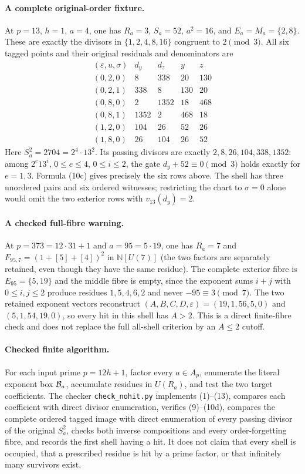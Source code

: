 \paragraph{A complete original-order fixture.}
At \(p=13\), \(h=1\), \(a=4\), one has \(R_a=3\), \(S_a=52\),
\(a^2=16\), and \(E_a=M_a=\{2,8\}\). These are exactly the
divisors in \(\{1,2,4,8,16\}\) congruent to \(2\pmod3\).
All six tagged points and their original residuals and denominators are
\[
\begin{array}{c|r|r|r|r}
 (\varepsilon,u,\sigma)&d_y&d_z&y&z\\\hline
 (0,2,0)&8&338&20&130\\
 (0,2,1)&338&8&130&20\\
 (0,8,0)&2&1352&18&468\\
 (0,8,1)&1352&2&468&18\\
 (1,2,0)&104&26&52&26\\
 (1,8,0)&26&104&26&52
\end{array}
\]
Here \(S_a^2=2704=2^4\cdot13^2\). Its passing divisors are
exactly \(2,8,26,104,338,1352\): among
\(2^e13^i\), \(0\le e\le4\), \(0\le i\le2\), the gate
\(d_y+52\equiv0\pmod3\) holds exactly for \(e=1,3\).
Formula (10c) gives precisely the six rows above. The shell has
three unordered pairs and six ordered witnesses; restricting the
chart to \(\sigma=0\) alone would omit the two exterior rows
with \(v_{13}(d_y)=2\).

\paragraph{A checked full-fibre warning.}
At $p=373=12\cdot31+1$ and $a=95=5\cdot19$, one has
$R_a=7$ and
$F_{95,7}=(1+[5]+[4])^2$ in $\mathbb N[U(7)]$ (the two
factors are separately retained, even though they have the same
residue).  The complete exterior fibre is
$E_{95}=\{5,19\}$ and the middle fibre is empty, since the
exponent sums $i+j$ with $0\le i,j\le2$ produce residues
$1,5,4,6,2$ and never $-95\equiv3\pmod7$.  The two retained
exponent vectors reconstruct $(A,B,C,D,\varepsilon)=(19,1,56,5,0)$
and $(5,1,54,19,0)$, so every hit in this shell has $A>2$.
This is a direct finite-fibre check and does not replace the full
all-shell criterion by an $A\le2$ cutoff.

\paragraph{Checked finite algorithm.}
For each input prime \(p=12h+1\), factor every \(a\in A_p\), enumerate
the literal exponent box \({\cal B}_a\), accumulate residues in
\(U(R_a)\), and test the two target coefficients. The checker
\texttt{check\_nohit.py} implements (1)--(13), compares each
coefficient with direct divisor enumeration, verifies (9)--(10d),
compares the complete ordered tagged image with direct enumeration
of every passing divisor of the original \(S_a^2\), checks both
inverse compositions and every order-forgetting fibre, and records
the first shell having a hit. It does not claim that
every shell is occupied, that a prescribed residue is hit by a
prime factor, or that infinitely many survivors exist.

